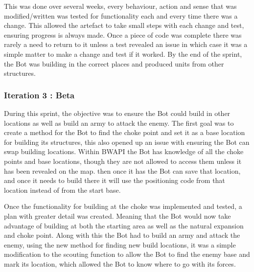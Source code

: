 \documentclass[journal]{IEEEtran}
\begin{document}
	This was done over several weeks, every behaviour, action and sense that was modified/written was tested for functionality each and every time there was a change. This allowed the artefact to take small steps with each change and test, ensuring progress is always made. Once a piece of code was complete there was rarely a need to return to it unless a test revealed an issue in which case it was a simple matter to make a change and test if it worked. By the end of the sprint, the Bot was building in the correct places and produced units from other structures.
	\newline
	
	\subsubsection{Iteration 3 : Beta}
	During this sprint, the objective was to ensure the Bot could build in other locations as well as build an army to attack the enemy. The first goal was to create a method for the Bot to find the choke point and set it as a base location for building its structures, this also opened up an issue with ensuring the Bot can swap building locations. Within BWAPI the Bot has knowledge of all the choke points and base locations, though they are not allowed to access them unless it has been revealed on the map. then once it has the Bot can save that location, and once it needs to build there it will use the positioning code from that location instead of from the start base. 
	
	Once the functionality for building at the choke was implemented and tested, a plan with greater detail was created. Meaning that the Bot would now take advantage of building at both the starting area as well as the natural expansion and choke point. Along with this the Bot had to build an army and attack the enemy, using the new method for finding new build locations, it was a simple modification to the scouting function to allow the Bot to find the enemy base and mark its location, which allowed the Bot to know where to go with its forces.
	\newline
	
\end{document}
